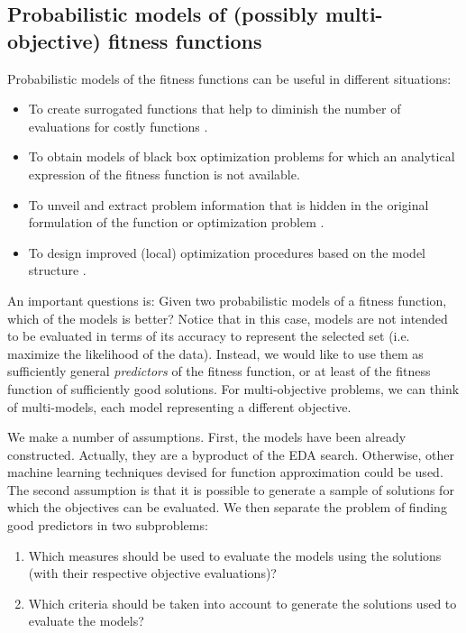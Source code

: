 \documentclass[a4paper]{article}
\begin{document}
   \subsection{Probabilistic models of (possibly multi-objective) fitness functions}

   Probabilistic models of the fitness functions
   can be useful in different situations:

  \begin{itemize}
    \item To create surrogated functions that help to diminish the number of evaluations for costly functions \cite{Lima_et_al:2006,Orriols_et_al:2007,Sastry_et_al:2004,Sastry_et_al:2006,Shakya:2006,Shakya_et_al:2005a}.
    \item To obtain models of black box optimization problems for
    which an analytical expression of the fitness function is not
    available.
    \item To unveil and extract problem information that is hidden in the
    original formulation of the function or optimization problem \cite{Brownlee_et_al:2008}.
    \item To design improved (local) optimization procedures based on
    the model structure \cite{Butz_et_al:2006,Pereira_et_al:2000,Rivera_and_Santana:2000,Sastry_et_al:2006}.
  \end{itemize}

An important questions is: Given two probabilistic models of a
fitness function, which of the models is better? Notice that in this
case, models are not intended to be evaluated in terms of its
accuracy to represent the selected set (i.e. maximize the likelihood
of the data).  Instead, we would like to use them as sufficiently
general \emph{predictors} of the fitness function, or at least of
the fitness function of sufficiently good solutions. For
multi-objective problems, we can think of multi-models, each model
representing a different objective.

We make a number of assumptions. First, the models have been already
constructed. Actually, they are a byproduct of the EDA search.
Otherwise, other machine learning techniques devised for function
approximation could be used. The second assumption is that it is
possible to generate a sample of solutions for which the objectives
can be evaluated.  We then separate the problem of finding good
predictors in two subproblems:

\begin{enumerate}
  \item Which measures should be used to evaluate the models using the solutions (with their respective objective
  evaluations)?
  \item Which criteria should be taken into account to generate the solutions used to evaluate the models?
\end{enumerate}
\end{document}
